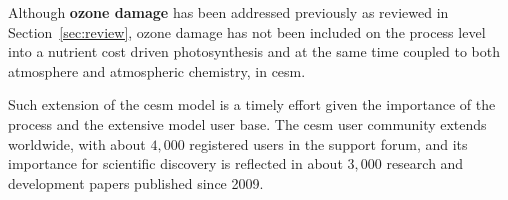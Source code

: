 Although \textbf{\color{red}ozone damage} has been addressed previously as reviewed in Section~\ref{sec:review}, ozone damage has not been included on the process level into a nutrient cost driven photosynthesis and at the same time coupled to both atmosphere and atmospheric chemistry, in \gls{cesm}.

Such extension of the \gls{cesm} model is a timely effort given the importance of the process and the extensive model user base. The \gls{cesm} user community extends worldwide, with about $4,000$ registered users in the support forum, and its importance for scientific discovery is reflected in about $3,000$ research and development papers published since 2009.


